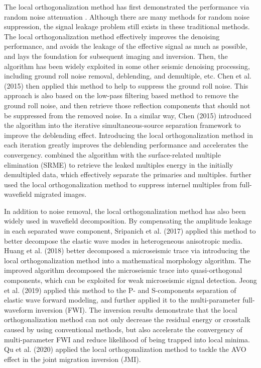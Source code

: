 The local orthogonalization method has first demonstrated the performance via random noise attenuation \cite{yangkang2015ortho}. Although there are many methods for random noise suppression, the signal leakage problem still exists in these traditional methods. The local orthogonalization method effectively improves the denoising performance, and avoids the leakage of the effective signal as much as possible, and lays the foundation for subsequent imaging and inversion. Then, the algorithm has been widely exploited in some other seismic denoising processing, including ground roll noise removal, deblending, and demultiple, etc. Chen et al. (2015) \cite{yangkang2015orthogroll} then applied this method to help to suppress the ground roll noise. This approach is also based on the low-pass filtering based method to remove the ground roll noise, and then retrieve those reflection components that should not be suppressed from the removed noise.  In a similar way, Chen (2015) \cite{yangkang2015dbortho} introduced the algorithm into the iterative simultaneous-source separation framework \cite{yangkang20142,shaohuan2019} to improve the deblending effect. Introducing the local orthogonalization method in each iteration greatly improves the deblending performance and accelerates the convergency. \cite{zhangdong2019ortho} combined the algorithm with the surface-related multiple elimination (SRME) to retrieve the leaked multiples energy in the initially demultipled data, which effectively separate the primaries and multiples. \cite{zhangdong2020geo} further used the local orthogonalization method to suppress internel multiples from full-wavefield migrated images.

In addition to noise removal, the local orthogonalization method has also been widely used in wavefield decomposition. By compensating the amplitude leakage in each separated wave component, Sripanich et al. (2017) \cite{sripanich2017elastic} applied this method to better decompose the elastic wave modes in heterogeneous anisotropic media. Huang et al. (2018) \cite{weilin2018} better decomposed a microseismic trace via introducing the local orthogonalization method into a mathematical morphology algorithm. The improved algorithm decomposed the microseismic trace into quasi-orthogonal components, which can be exploited for weak microseismic signal detection.  Jeong et al. (2019) \cite{jeong2019enhanced} applied this method to the P- and S-components separation of elastic wave forward modeling, and further applied it to the multi-parameter full-waveform inversion (FWI). The inversion results demonstrate that the local orthogonalization method can not only decrease the residual energy or crosstalk caused by using conventional methods, but also accelerate the convergency of multi-parameter FWI and reduce likelihood of being trapped into local minima. Qu et al. (2020) \cite{qu2020robust} applied the local orthogonalization method to tackle the AVO effect in the joint migration inversion (JMI).

